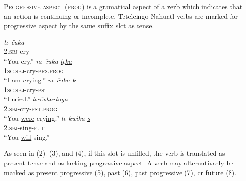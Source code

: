 \documentclass[doc,12pt]{apa6}
\begin{document}
\textsc{Progressive aspect} (\textsc{prog}) is a gramatical aspect of a verb which
indicates that an action is continuing or incomplete. Tetelcingo Nahuatl verbs
are marked for progressive aspect by the same suffix slot as tense.

\begin{exe}
	\ex \textit{t$\iota$-\v{c}uka} \\
		\textsc{2.sbj}-cry \\
		``You cry.''
	\ex \textit{n$\iota$-\v{c}uka-\underline{t$\iota$ka}} \\
		\textsc{1sg.sbj}-cry-\textsc{prs.prog} \\
		``I \underline{am} cry\underline{ing}.''
	\ex \textit{n$\iota$-\v{c}uka-\underline{k}} \\
		\textsc{1sg.sbj}-cry-\underline{\textsc{pst}} \\
		``I cr\underline{ied}.''
	\ex \textit{t$\iota$-\v{c}uka-\underline{taya}} \\
		\textsc{2.sbj}-cry-\textsc{pst.prog} \\
		``You \underline{were} cry\underline{ing}.''
	\ex \textit{t$\iota$-kwika-\underline{s}} \\
		\textsc{2.sbj}-sing-\textsc{fut} \\
		``You \underline{will} sing.''
\end{exe}

As seen in (2), (3), and (4), if this slot is unfilled, the verb is translated
as present tense and as lacking progressive aspect. A verb may alternativeely
be marked as present progressive (5), past (6), past progressive (7), or future
(8).
\end{document}
